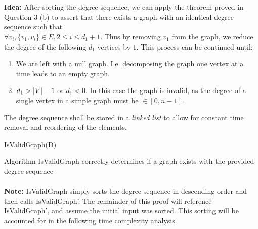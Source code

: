 \documentclass[12pt]{article}
\newenvironment{lemma}[2][Lemma]{\begin{trivlist}
\item[\hskip \labelsep {\bfseries #1}\hskip \labelsep {\bfseries #2.}]}{\end{trivlist}}
\newenvironment{question}[2][Question]{\begin{trivlist}
\item[\hskip \labelsep {\bfseries #1}\hskip \labelsep {\bfseries #2.}]}{\end{trivlist}}
\DeclarePairedDelimiter\abs{\lvert}{\rvert}%
\begin{document}
\begin{question}{3 (c)}
  \leavevmode \\ \\
  \textbf{Idea:} After sorting the degree sequence, we can apply the theorem
  proved in Question 3 (b) to assert that there exists a graph with an identical
  degree sequence such that \\
  $\forall v_{i}, \{v_{1}, v_{i}\} \in E, 2 \leq i \leq d_{1}+1$.  Thus by
  removing $v_{1}$ from the graph, we reduce the degree of the following $d_{1}$
  vertices by $1$.  This process can be continued until:
  \begin{enumerate}
      \item We are left with a null graph.  I.e. decomposing the graph one vertex
        at a time leads to an empty graph.
      \item $d_{1} > \abs{V} - 1$ or $d_{1} < 0$.  In this case the graph is
        invalid, as the degree of a single vertex in a simple graph must be
        $\in [0, n-1]$.
  \end{enumerate}
  The degree sequence shall be stored in a \textit{linked list} to allow for
  constant time removal and reordering of the elements.

  \begin{algorithm}[H]
    \caption{IsValidGraph(D)}
    \BlankLine



    \BlankLine
  \end{algorithm}

  \begin{lemma}{3.1} Algorithm IsValidGraph correctly determines if a graph exists
    with the provided degree sequence
    \leavevmode \\ \\
    \textbf{Note:} IsValidGraph simply sorts the degree sequence in descending order
    and then calls IsValidGraph'.  The remainder of this proof will reference
    IsValidGraph', and assume the initial input was sorted.  This sorting will
    be accounted for in the following time complexity analysis.\\


\end{lemma}
\end{question}
\end{document}
